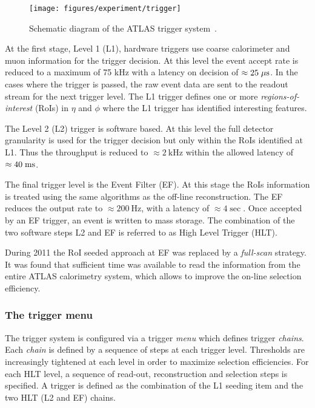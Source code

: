 \begin{figure}[ht]
\begin{center}
\texttt{[image: figures/experiment/trigger]}
\caption[ATLAS trigger system]{
  Schematic diagram of the ATLAS trigger system~\cite{trigger}. }
\label{fig:trigger}
\end{center}
\end{figure}

At the first stage, Level 1 (L1), hardware triggers use coarse
calorimeter and muon information for the trigger decision. At this
level the event accept rate is reduced to a maximum of 75 kHz with a
latency on decision of $\approx{}25\; \mu\mathrm{s}{}$. In the cases where the
trigger is passed, the raw event data are sent to the readout stream
for the next trigger level. The L1 trigger defines one or more
\emph{regions-of-interest} (RoIs) in $\eta{}$ and $\phi{}$ where the
L1 trigger has identified interesting features. 

The Level 2 (L2) trigger is software based. At this level the full detector
granularity is used for the trigger decision but only within the RoIs
identified at L1. Thus the throughput is reduced to
$\approx{}2~\mathrm{kHz}$ within the allowed latency of $\approx{}40\; \mathrm{ms}{}$.

The final trigger level is the Event Filter (EF). At this stage the RoIs
information is treated using the same algorithms as the off-line
reconstruction. The EF reduces the output rate to $\approx{}200~\mathrm{Hz}$, 
with a latency of $\approx{}4\sec{}$. Once accepted by an EF trigger, an
event is written to mass storage.
The combination of the two software steps L2 and EF is referred to 
as High Level Trigger (HLT).

During 2011 the RoI seeded approach at EF was replaced by a
{\it full-scan} strategy. It was found that sufficient time was available
to read the information from the entire ATLAS calorimetry system, 
which allows to improve the on-line selection efficiency.

\subsubsection{The trigger menu}

The trigger system is configured via a trigger \textit{menu} which
defines trigger \textit{chains}.
Each \textit{chain} is defined by a sequence of steps at each trigger level.
Thresholds are increasingly tightened at each level in order to
maximize selection efficiencies. 
For each HLT level, a sequence of read-out, reconstruction and
selection steps is specified. 
A trigger is defined as the combination of the L1 seeding item and the
two HLT (L2 and EF) chains. 

